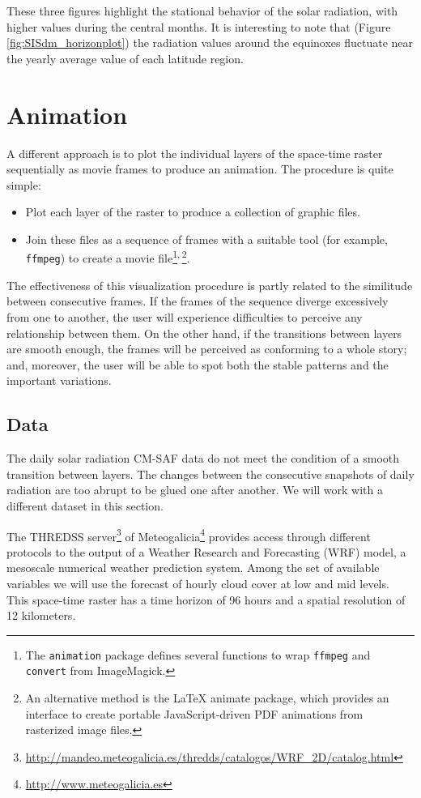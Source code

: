 \documentclass[smallroyalvopaper]{memoir}
\begin{document}
These three figures highlight the stational behavior of the solar
radiation, with higher values during the central months. It is
interesting to note that (Figure \ref{fig:SISdm_horizonplot}) the
radiation values around the equinoxes fluctuate near the yearly
average value of each latitude region.
\section{Animation}
\label{sec-5}
\label{sec:animationST}

A different approach is to plot the individual layers of the
space-time raster sequentially as movie frames to produce an
animation. The procedure is quite simple:
\begin{itemize}
\item Plot each layer of the raster to produce a collection of graphic
files.
\item Join these files as a sequence of frames with a suitable tool (for
example, \texttt{ffmpeg}) to create a movie file\footnote{The \texttt{animation} package \cite{Xie2013} defines several functions to wrap \texttt{ffmpeg} and \texttt{convert} from ImageMagick.}\textsuperscript{,}\,\footnote{An alternative method is the \LaTeX{} animate package, which
provides an interface to create portable JavaScript-driven PDF
animations from rasterized image files.}.
\end{itemize}


The effectiveness of this visualization procedure is partly related to
the similitude between consecutive frames. If the frames of the
sequence diverge excessively from one to another, the user will
experience difficulties to perceive any relationship between them. On
the other hand, if the transitions between layers are smooth enough,
the frames will be perceived as conforming to a whole story; and,
moreover, the user will be able to spot both the stable patterns and
the important variations.

\subsection{Data}
\label{sec-5-1}
The daily solar radiation CM-SAF data do not meet the condition of
a smooth transition between layers. The changes between the consecutive
snapshots of daily radiation are too abrupt to be glued one after
another. We will work with a different dataset in this section.

The THREDSS server\footnote{\url{http://mandeo.meteogalicia.es/thredds/catalogos/WRF_2D/catalog.html}} of Meteogalicia\footnote{\url{http://www.meteogalicia.es}} provides access
through different protocols to the output of a Weather Research
and Forecasting (WRF) model, a mesoscale numerical weather
prediction system. Among the set of available variables we will
use the forecast of hourly cloud cover at low and mid levels. This
space-time raster has a time horizon of 96 hours and a spatial
resolution of 12 kilometers.
\end{document}
